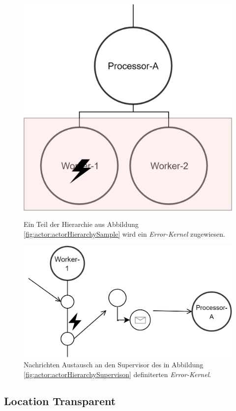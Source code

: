 \begin{figure}
    \centering
    \begin{minipage}{.4\textwidth}
        \centering
        \includegraphics[width=\linewidth]{gfx/actor/actorHierchyErrorKernel}
        \caption{Ein Teil der Hierarchie aus Abbildung \ref{fig:actor:actorHierarchySample} wird ein \textit{Error-Kernel} zugewiesen.}
        \label{fig:actor:actorHierarchySupervison}        
    \end{minipage}%
    \begin{minipage}{.1\textwidth}
    \end{minipage}%
    \begin{minipage}{.5\textwidth}
      \centering
      \includegraphics[width=\linewidth]{gfx/actor/actorSupervisionMessageExample}
      \caption{Nachrichten Austausch an den Supervisor des in Abbildung \ref{fig:actor:actorHierarchySupervison} definiterten \textit{Error-Kernel}.}
      \label{fig:actor:actorHierarchySupervisonMessaging}
    \end{minipage}
\end{figure}  

\subsection{Location Transparent}\label{actor:locationTransparency}
